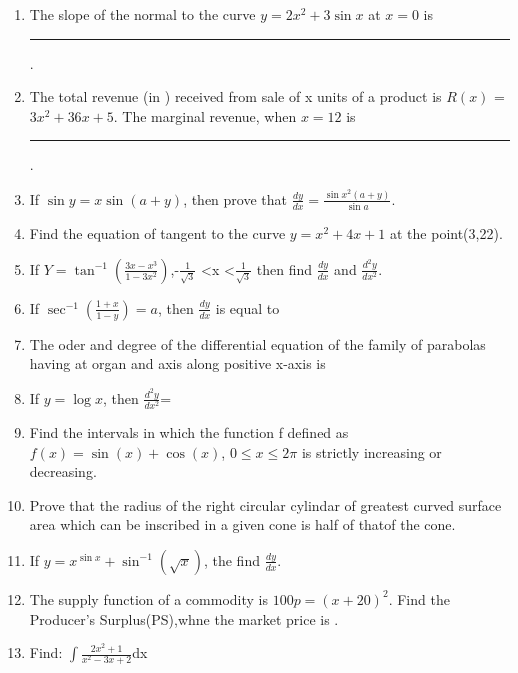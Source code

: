 \begin{enumerate}
\item The slope of the normal to the curve $y=2x^2+3\sin{x}$ at $x=0$ is \rule{30pt}{1pt}.

\item The total revenue (in \rupee) received from sale of x units of a product is $R(x)$ = $3x^2+36x+5$. The marginal revenue, when $x=12$ is \rule{30pt}{1pt}.

\item If $\sin y = x \sin(a+y)$, then prove that $\frac {dy}{dx} = \frac {\sin x^2(a+y)}{\sin a}$.

\item Find the equation of tangent to the curve $y=x^2+4x+1$ at the point(3,22).

\item If $Y = \tan^{-1}\left(\frac{3x - x^3}{1 - 3x^2}\right)$,-$\frac{1}{\sqrt{3}}$ \textless x \textless $\frac{1}{\sqrt{3}}$
then find $\frac{dy}{dx}$ and $\frac{{d^2y}}{{dx^2}}$.

\item If $\sec^{-1}\left(\frac{1+x}{1-y}\right)=a$, then $\frac{dy}{dx}$ is equal to

\item The oder and degree of the differential equation of the family of parabolas having at 
organ and axis along positive x-axis is

\item If $y = \log x$, then $\frac{{d^2y}}{{dx^2}}$=

\item Find the intervals in which the function f defined as $f(x) = \sin(x) + \cos(x)$,
$0 \leq x \leq 2\pi$ is strictly increasing or decreasing.

\item Prove that the radius of the right circular 
cylindar of greatest curved surface area which 
can be inscribed in a given cone is half of thatof the cone.

\item If $y=x^{\sin x }+\sin^{-1}(\sqrt x )$, the find $\frac{dy}{dx}$.

\item The supply function of a commodity is 
$100p = (x+20)^2$. Find the Producer's
Surplus(PS),whne the market price is .

\item Find:
$\int{\frac{2x^2 + 1}{x^2 - 3x + 2}}$dx

 \end{enumerate}
